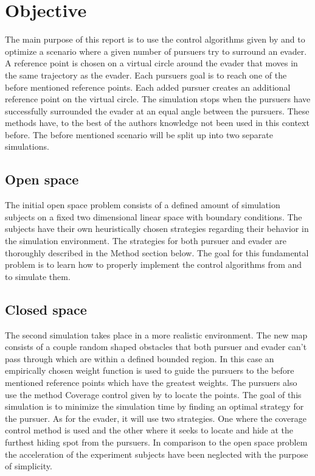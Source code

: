 \documentclass[ebook,11pt] {kth-mag}
\begin{document}
\section{Objective}
The main purpose of this report is to use the control algorithms given by \cite{vva} and to optimize a scenario where a given number of pursuers try to surround an evader. A reference point is chosen on a virtual circle around the evader that moves in the same trajectory as the evader. Each pursuers goal is to reach one of the before mentioned reference points. Each added pursuer creates an additional reference point on the virtual circle. The simulation stops when the pursuers have successfully surrounded the evader at an equal angle between the pursuers. These methods have, to the best of the authors knowledge not been used in this context before. The before mentioned scenario will be split up into two separate simulations. 

\subsection{Open space}
The initial open space problem consists of a defined amount of simulation subjects on a fixed two dimensional linear space with boundary conditions. The subjects have their own heuristically chosen strategies regarding their behavior in the simulation environment. The strategies for both pursuer and evader are thoroughly described in the Method section below. The goal for this fundamental problem is to learn how to properly implement the control algorithms from \cite{vva} and to simulate them. 

\subsection{Closed space}

The second simulation takes place in a more realistic environment. The new map consists of a couple random shaped obstacles that both pursuer and evader can't pass through which are within a defined bounded region. In this case an empirically chosen weight function is used to guide the pursuers to the before mentioned reference points which have the greatest weights. The pursuers also use the method Coverage control given by \cite{sui} to locate the points. The goal of this simulation is to minimize the simulation time by finding an optimal strategy for the pursuer. As for the evader, it will use two strategies. One where the coverage control method is used and the other where it seeks to locate and hide at the furthest hiding spot from the pursuers. In comparison to the open space problem the acceleration of the experiment subjects have been neglected with the purpose of simplicity.
\end{document}

